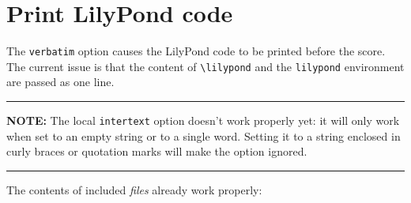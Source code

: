 \documentclass{scrartcl}
\begin{document}
\section*{Print LilyPond code}

The \texttt{verbatim} option causes the LilyPond code to be printed before the score.  The current issue is that the content of \texttt{\textbackslash lilypond} and the \texttt{lilypond} environment are passed as one line.


\hrule

\textbf{NOTE:} The local \texttt{intertext} option doesn't work properly yet: it will only work when set to an empty string or to a single word. Setting it to a string enclosed in curly braces or quotation marks will make the option ignored.


\hrule

\medskip
\renewcommand{\lyIntertext}[1]{

\textcolor{magenta}{#1}

\bigskip
}
The contents of included \emph{files} already work properly:


\lysetverbenv{\begin{verbatim}}{\end{verbatim}}

\end{document}
